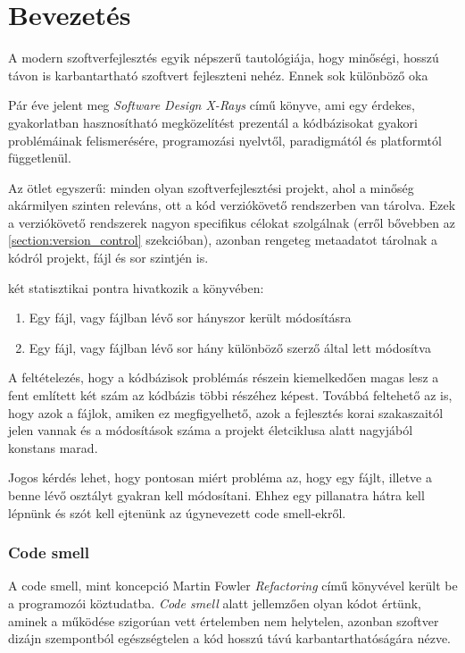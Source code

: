 \chapter{Bevezetés}
\label{ch:intro}

A modern szoftverfejlesztés egyik népszerű tautológiája, hogy minőségi, hosszú távon is karbantartható szoftvert fejleszteni nehéz. Ennek sok különböző oka

Pár éve jelent meg \citeauthor{tornhillXrays} \textit{Software Design X-Rays}\cite{tornhillXrays} című könyve, ami egy érdekes, gyakorlatban hasznosítható megközelítést prezentál a kódbázisokat gyakori problémáinak felismerésére, programozási nyelvtől, paradigmától és platformtól függetlenül. 

Az ötlet egyszerű: minden olyan szoftverfejlesztési projekt, ahol a minőség akármilyen szinten releváns, ott a kód verziókövető rendszerben van tárolva. Ezek a verziókövető rendszerek nagyon specifikus célokat szolgálnak (erről bővebben az \ref{section:version_control} szekcióban), azonban rengeteg metaadatot tárolnak a kódról projekt, fájl és sor szintjén is.

\citeauthor{tornhillXrays} két statisztikai pontra hivatkozik a könyvében:
\begin{enumerate}
    \item Egy fájl, vagy fájlban lévő sor hányszor került módosításra
    \item Egy fájl, vagy fájlban lévő sor hány különböző szerző által lett módosítva
\end{enumerate}

A feltételezés, hogy a kódbázisok problémás részein kiemelkedően magas lesz a fent említett két szám az kódbázis többi részéhez képest. Továbbá feltehető az is, hogy azok a fájlok, amiken ez megfigyelhető, azok a fejlesztés korai szakaszaitól jelen vannak és a módosítások száma a projekt életciklusa alatt nagyjából konstans marad.

Jogos kérdés lehet, hogy pontosan miért probléma az, hogy egy fájlt, illetve a benne lévő osztályt gyakran kell módosítani. Ehhez egy pillanatra hátra kell lépnünk és szót kell ejtenünk az úgynevezett code smell-ekről.

\subsection{Code smell}

A code smell, mint koncepció Martin Fowler \textit{Refactoring}\cite{fowlerRefactoring} című könyvével került be a programozói köztudatba. \textit{Code smell} alatt jellemzően olyan kódot értünk, aminek a működése szigorúan vett értelemben nem helytelen, azonban szoftver dizájn szempontból egészségtelen a kód hosszú távú karbantarthatóságára nézve. 

